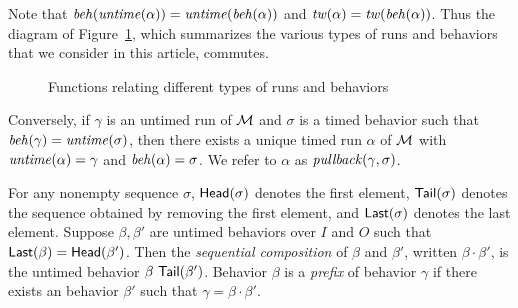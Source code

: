 \fi
Note that $\mathit{beh}(\mathit{untime}(\alpha))=\mathit{untime}(\mathit{beh}(\alpha))$ and $\mathit{tw}(\alpha) = \mathit{tw}(\mathit{beh}(\alpha))$.
\iflong
Thus the diagram of Figure~\ref{fig:diagram}, which summarizes the various types of runs and behaviors that we consider
in this article, commutes.
\begin{figure}[h]
\centering
{}
\caption{Functions relating different types of runs and behaviors}
\label{fig:diagram}
\end{figure}
\fi
Conversely, if $\gamma$ is an untimed run  of ${\cal M}$ and $\sigma$ is a timed behavior such that $\mathit{beh}(\gamma) = \mathit{untime}(\sigma)$,
then there exists a unique timed run $\alpha$ of ${\cal M}$ with $\mathit{untime}(\alpha) = \gamma$ and $\mathit{beh}(\alpha) = \sigma$.
We refer to $\alpha$ as $\mathit{pullback}(\gamma,\sigma)$.

For any nonempty sequence $\sigma$, $\mathsf{Head}({\sigma})$ denotes the first element, $\mathsf{Tail}({\sigma})$ denotes the sequence obtained by removing the first element, and $\mathsf{Last}({\sigma})$ denotes the last element.
Suppose $\beta, \beta'$ are untimed behaviors over $I$ and $O$ such that $\mathsf{Last}({\beta}) = \mathsf{Head}({\beta'})$.
Then the \emph{sequential composition} of $\beta$ and $\beta'$, written $\beta \cdot \beta'$, is the untimed behavior $\beta ~ \mathsf{Tail}({\beta'})$.
Behavior $\beta$ is a \emph{prefix} of behavior $\gamma$ if there exists an behavior $\beta'$ such that $\gamma = \beta \cdot \beta'$.

